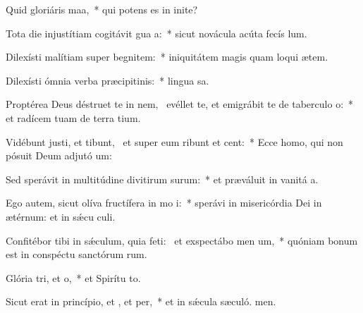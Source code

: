 \item Quid gloriáris  maa,~* qui potens es in inite?
\item Tota die injustítiam cogitávit gua a:~* sicut novácula acúta fecís lum.
\item Dilexísti malítiam super begnitem:~* iniquitátem magis quam loqui ætem.
\item Dilexísti ómnia verba præcipitinis:~* lingua sa.
\item Proptérea Deus déstruet te in nem,~\pscross{} evéllet te, et emigrábit te de taberculo o:~* et radícem tuam de terra tium.
\item Vidébunt justi, et tibunt,~\pscross{} et super eum ribunt et cent:~* Ecce homo, qui non pósuit Deum adjutó um:
\item Sed sperávit in multitúdine divitirum surum:~* et præváluit in vanitá a.
\item Ego autem, sicut olíva fructífera in mo i:~* sperávi in misericórdia Dei in ætérnum: et in sǽcu culi.
\item Confitébor tibi in sǽculum, quia feti:~\pscross{} et exspectábo men um,~* quóniam bonum est in conspéctu sanctórum rum.
\item Glória tri, et o,~* et Spirítu to.
\item Sicut erat in princípio, et , et per,~* et in sǽcula sæculó. men.
